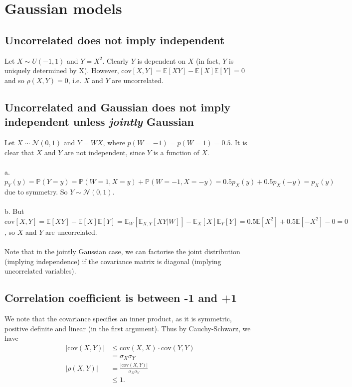 \section{Gaussian models}
\subsection{Uncorrelated does not imply independent}
Let $X \sim U(-1,1)$ and $Y = X^2$. Clearly $Y$ is dependent on $X$ (in fact, $Y$ is uniquely determined by X). However, $\mathrm{cov}[X,Y] = \mathbb{E}[XY]-\mathbb{E}[X]\mathbb{E}[Y] = 0$ and so $\rho(X,Y)=0$, i.e. $X$ and $Y$ are uncorrelated.

\subsection{Uncorrelated and Gaussian does not imply independent unless \textit{jointly} Gaussian}
Let $X \sim \mathcal{N}(0,1)$ and $Y=WX$, where $p(W=-1)=p(W=1)=0.5$. It is clear that $X$ and $Y$ are not independent, since $Y$ is a function of $X$.\\\\
a. $p_Y(y) = \mathbb{P}(Y=y) = \mathbb{P}(W=1,X=y) + \mathbb{P}(W=-1,X=-y) = 0.5p_X(y) + 0.5p_X(-y) = p_X(y)$ due to symmetry. So $Y \sim \mathcal{N}(0,1)$.\\\\
b. But $\mathrm{cov}[X,Y] = \mathbb{E}[XY] - \mathbb{E}[X]\mathbb{E}[Y] = \mathbb{E}_W[\mathbb{E}_{X,Y}[XY|W]] - \mathbb{E}_X[X]\mathbb{E}_Y[Y] = 0.5\mathbb{E}[X^2] + 0.5\mathbb{E}[-X^2] - 0 = 0$, so $X$ and $Y$ are uncorrelated.\\\\
Note that in the jointly Gaussian case, we can factorise the joint distribution (implying independence) if the covariance matrix is diagonal (implying uncorrelated variables).

\subsection{Correlation coefficient is between -1 and +1}
We note that the covariance specifies an inner product, as it is symmetric, positive definite and linear (in the first argument). Thus by Cauchy-Schwarz, we have
\begin{align*}
|\mathrm{cov}(X,Y)| &\leq \mathrm{cov}(X,X) \cdot \mathrm{cov}(Y,Y)\\
&= \sigma_X\sigma_Y\\
|\rho(X,Y)| &= \frac{|\mathrm{cov}(X,Y)|}{\sigma_X\sigma_Y}\\
&\leq 1.
\end{align*}

